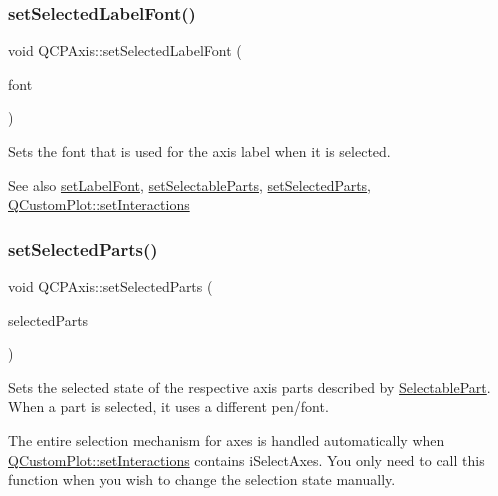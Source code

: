 \subsubsection{\texorpdfstring{set\+Selected\+Label\+Font()}{setSelectedLabelFont()}}
{\footnotesize\ttfamily void Q\+C\+P\+Axis\+::set\+Selected\+Label\+Font (\begin{DoxyParamCaption}\item[{const Q\+Font \&}]{font }\end{DoxyParamCaption})}

Sets the font that is used for the axis label when it is selected.

\begin{DoxySeeAlso}{See also}
\mbox{\hyperlink{class_q_c_p_axis_a71ac1a47f7547e490a8c4311d1433cf3}{set\+Label\+Font}}, \mbox{\hyperlink{class_q_c_p_axis_a513f9b9e326c505d9bec54880031b085}{set\+Selectable\+Parts}}, \mbox{\hyperlink{class_q_c_p_axis_ab9d7a69277dcbed9119b3c1f25ca19c3}{set\+Selected\+Parts}}, \mbox{\hyperlink{class_q_custom_plot_a5ee1e2f6ae27419deca53e75907c27e5}{Q\+Custom\+Plot\+::set\+Interactions}} 
\end{DoxySeeAlso}
\mbox{\label{class_q_c_p_axis_ab9d7a69277dcbed9119b3c1f25ca19c3}} 
\subsubsection{\texorpdfstring{set\+Selected\+Parts()}{setSelectedParts()}}
{\footnotesize\ttfamily void Q\+C\+P\+Axis\+::set\+Selected\+Parts (\begin{DoxyParamCaption}\item[{const Q\+C\+P\+Axis\+::\+Selectable\+Parts \&}]{selected\+Parts }\end{DoxyParamCaption})}

Sets the selected state of the respective axis parts described by \mbox{\hyperlink{class_q_c_p_axis_abee4c7a54c468b1385dfce2c898b115f}{Selectable\+Part}}. When a part is selected, it uses a different pen/font.

The entire selection mechanism for axes is handled automatically when \mbox{\hyperlink{class_q_custom_plot_a5ee1e2f6ae27419deca53e75907c27e5}{Q\+Custom\+Plot\+::set\+Interactions}} contains i\+Select\+Axes. You only need to call this function when you wish to change the selection state manually.


